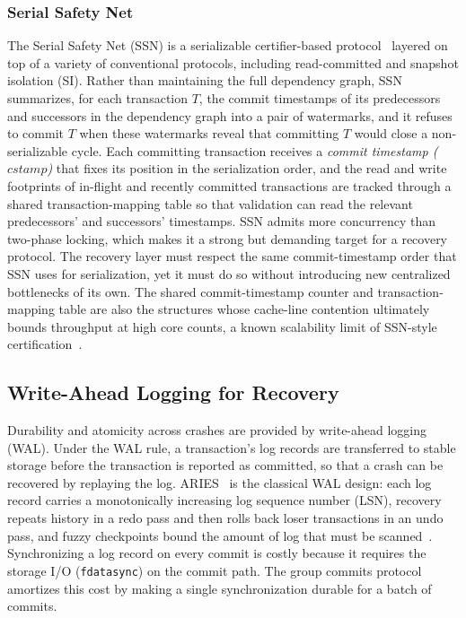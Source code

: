 \subsubsection{Serial Safety Net}

The Serial Safety Net (SSN) is a serializable certifier-based protocol~\cite{wang2017ssn,kim2016ermia} layered on top of a variety of conventional protocols, including read-committed and snapshot isolation (SI).
%
Rather than maintaining the full dependency graph, SSN summarizes, for each transaction $T$, the commit
timestamps of its predecessors and successors in the dependency graph into a pair of watermarks, and it refuses to commit $T$ when these watermarks reveal that committing $T$ would close a non-serializable cycle.  Each committing transaction receives a \textit{commit timestamp ($\mathit{cstamp}$)} that fixes its position in the serialization order, and the read and write footprints of in-flight and recently committed transactions are tracked through a shared transaction-mapping table so that validation can read the relevant predecessors' and successors' timestamps.  
%
SSN admits more concurrency than two-phase locking, which makes it a strong but demanding target for a recovery protocol.  The recovery layer must respect the same commit-timestamp order that SSN uses for serialization, yet it must do so without introducing new centralized bottlenecks of its own.  The shared commit-timestamp counter and transaction-mapping table are also the structures whose cache-line contention ultimately bounds throughput at high core counts, a known scalability limit of SSN-style certification~\cite{tanabe2020ccbench}.

\subsection{Write-Ahead Logging for Recovery}

Durability and atomicity across crashes are provided by write-ahead logging (WAL).  Under the WAL rule, a transaction's log records are transferred to stable storage before the transaction is reported as committed, so that a crash can be recovered by replaying the log.  
%
ARIES~\cite{mohan1992aries} is the classical WAL design: each log record carries a monotonically increasing log sequence number (LSN), recovery repeats history in a redo pass and then rolls back loser transactions in an undo
pass, and fuzzy checkpoints bound the amount of log that must be scanned~\cite{haerder1983principles, mohan1992aries}. Synchronizing a log record on every commit is costly because it requires the storage I/O
(\texttt{fdatasync}) on the commit path. 
%
The group commits protocol amortizes this cost by making a single synchronization durable for a batch of commits.  

